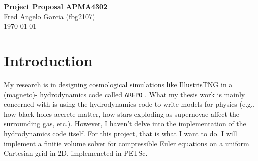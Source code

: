 \documentclass[12pt]{article}
\begin{document}
\begin{flushleft}
\textbf{Project Proposal APMA4302} \\
Fred Angelo Garcia (fbg2107) \\
\today
\end{flushleft}

\vspace{0.1in}

\section{Introduction}
My research is in designing cosmological simulations like IllustrisTNG \citep{2019ComAC...6....2N} in a (magneto)- hydrodynamics code called \texttt{AREPO} \citep{2020ApJS..248...32W}. What my thesis work is mainly concerned with is using the hydrodynamics code to write models for physics (e.g., how black holes accrete matter, how stars exploding as supernovae affect the surrounding gas, etc.). However, I haven't delve into the implementation of the hydrodynamics code itself. For this project, that is what I want to do. I will implement a finitie volume solver for compressible Euler equations on a uniform Cartesian grid in 2D, implemeneted in PETSc. 
\end{document}
